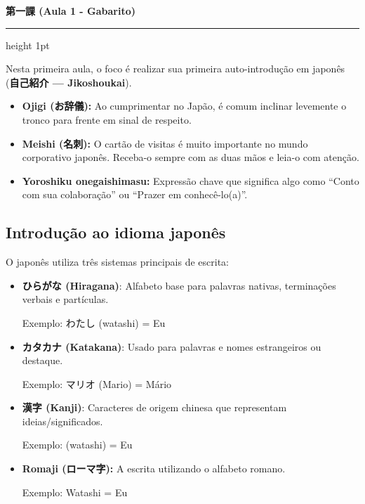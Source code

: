 \documentclass[12pt,a4paper]{article}
\begin{document}
\begin{center}
    {\LARGE\bfseries 第一課 (Aula 1 - Gabarito)}\\[4pt]
\end{center}

\vspace{0.3cm}
\hrule height 1pt
\vspace{0.5cm}

\begin{tcolorbox}[colback=jppurple!6, colframe=jppurple, title=\textbf{Dica Cultural}, fonttitle=\bfseries]
\small
Nesta primeira aula, o foco é realizar sua primeira auto-introdução em japonês (\textbf{自己紹介 --- Jikoshoukai}). 
\begin{itemize}[leftmargin=*, topsep=2pt, itemsep=1pt]
    \item \textbf{Ojigi (お辞儀):} Ao cumprimentar no Japão, é comum inclinar levemente o tronco para frente em sinal de respeito.
    \item \textbf{Meishi (名刺):} O cartão de visitas é muito importante no mundo corporativo japonês. Receba-o sempre com as duas mãos e leia-o com atenção.
    \item \textbf{Yoroshiku onegaishimasu:} Expressão chave que significa algo como ``Conto com sua colaboração'' ou ``Prazer em conhecê-lo(a)''.
\end{itemize}
\end{tcolorbox}

\subsection*{Introdução ao idioma japonês}

O japonês utiliza três sistemas principais de escrita:

\begin{itemize}[leftmargin=*]
    \item \textbf{ひらがな (Hiragana)}: Alfabeto base para palavras nativas, terminações verbais e partículas.
    
    Exemplo: わたし (watashi) = Eu

    \item \textbf{カタカナ (Katakana)}: Usado para palavras e nomes estrangeiros ou destaque.

    Exemplo:  マリオ (Mario) = Mário

    \item \textbf{漢字 (Kanji)}: Caracteres de origem chinesa que representam ideias/significados.

    Exemplo:  (watashi) = Eu

    \item \textbf{Romaji (ローマ字):} A escrita utilizando o alfabeto romano. 

    Exemplo: Watashi = Eu
\end{itemize}
\end{document}

